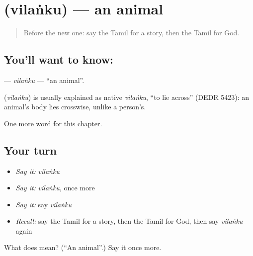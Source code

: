 \section[\texorpdfstring{\ta{விலங்கு} (vilaṅku)}{விலங்கு (vilaṅku)}]{ (vilaṅku) — an animal}

\label{lesson:TA-C274-vilanku}



\begin{quote}
Before the new one: say the Tamil for a story, then the Tamil for God.
\end{quote}

\subsection*{You'll want to know: }
\textbf{} — \emph{vilaṅku} — \textquotedblleft{}an animal\textquotedblright{}.

\begin{cousinweb}
\textbf{} (\emph{vilaṅku}) is usually explained as native \emph{vilaṅku}, \textquotedblleft{}to lie across\textquotedblright{} (DEDR 5423): an animal's body lies crosswise, unlike a person's.
\end{cousinweb}

\begin{grammarlens}[title={What you've built}]
One more word for this chapter.
\end{grammarlens}

\subsection*{Your turn}
\begin{itemize}
\raggedright
  \item \emph{Say it:} \emph{vilaṅku}
  \item \emph{Say it:} \emph{vilaṅku}, once more
  \item \emph{Say it:} say \emph{vilaṅku}
  \item \emph{Recall:} say the Tamil for a story, then the Tamil for God, then say \emph{vilaṅku} again
\end{itemize}

\begin{tcolorbox}[breakable,colback=teal!4,colframe=teal!35!black,title={Before you move on}]
What does  mean? (\textquotedblleft{}An animal\textquotedblright{}.) Say it once more.
\end{tcolorbox}
